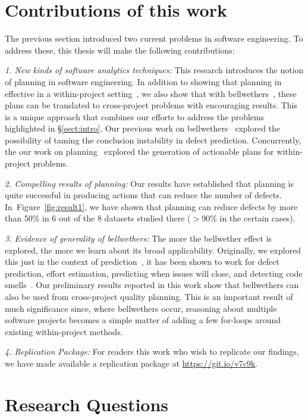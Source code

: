 \documentclass[conference]{IEEEtran}
\newcommand{\tion}[1]{\S\ref{sect:#1}}
\newcommand{\fig}[1]{Figure~\ref{fig:#1}}
\begin{document}
\section{Contributions of this work}
\label{sect:contributions}

The previous section introduced two current problems in software engineering. To address these, this thesis will make the following contributions:

\textit{1. New kinds of software analytics techniques:} This research introduces the notion of planning in software engineering. In addition to showing that planning in effective in a within-project setting~\cite{krishna17a}, we also show that with bellwethers~\cite{krishna16}, these plans can be translated to cross-project problems with encouraging results. 
This is a unique approach that combines our efforts to address the problems highlighted in \tion{intro}. Our previous work on bellwethers~\cite{krishna16} explored the possibility of taming the conclusion instability in defect prediction. Concurrently, the our work on planning~\cite{krishna17a} explored the generation of actionable plans for within-project problems. 

\textit{2. Compelling results of planning:} Our results have established that planning is quite successful in producing actions that can reduce the number of defects. In~\fig{result1}, we have shown that planning can reduce defects by more than 50\% in 6 out of the 8 datasets studied there ($>$90\% in the certain cases).

\textit{3. Evidence of generality of bellwethers:}
The more the bellwether effect is explored, the more we learn about its broad applicability. Originally, we explored this just in the context of prediction~\cite{krishna16}, it has been shown to work for defect prediction, effort estimation, predicting when issues will close, and detecting code smells~\cite{krishna17b}. Our preliminary results reported in this work show that bellwethers can also be used from cross-project quality planning. This is an important result of much significance since, where bellwethers occur, reasoning about multiple software projects becomes a simple matter of adding a few for-loops around existing within-project methods.

\textit{4. Replication Package:} For readers this work who wish to replicate our findings, we have made available a replication package at \url{https://git.io/v7c9k}. 


\section{Research Questions}
\end{document}
